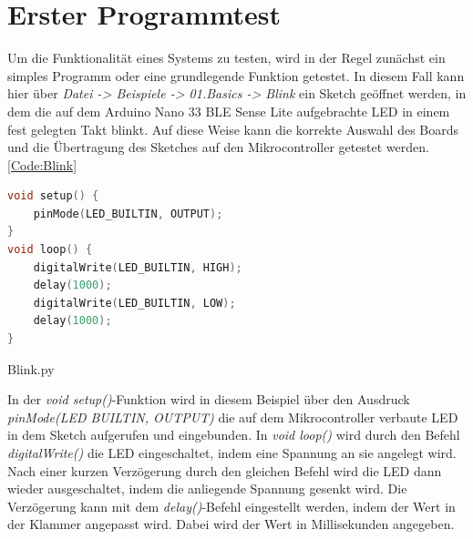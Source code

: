 \section{Erster Programmtest}
Um die Funktionalität eines Systems zu testen, wird in der Regel zunächst ein simples Programm oder eine grundlegende Funktion getestet.
In diesem Fall kann hier über \textit{Datei -> Beispiele -> 01.Basics -> Blink} ein Sketch geöffnet werden, in dem die auf dem Arduino Nano 33 BLE Sense Lite aufgebrachte LED in einem fest gelegten Takt blinkt. Auf diese Weise kann die korrekte Auswahl des Boards und die Übertragung des Sketches auf den Mikrocontroller getestet werden.
\ref{Code:Blink}

\begin{code}
	\begin{lstlisting}[language=c++]
void setup() {
	pinMode(LED_BUILTIN, OUTPUT);
}
void loop() {
	digitalWrite(LED_BUILTIN, HIGH);
	delay(1000);                     
	digitalWrite(LED_BUILTIN, LOW);  
	delay(1000);                     
}
\end{lstlisting}      

\caption[Blink.py]{Blink.py}\label{Code:Blink}    
\end{code} 

In der \textit{void setup()}-Funktion wird in diesem Beispiel über den Ausdruck \textit{pinMode(LED BUILTIN, OUTPUT)} die auf dem Mikrocontroller verbaute LED in dem Sketch aufgerufen und eingebunden.
In \textit{void loop()} wird durch den Befehl\textit{ digitalWrite()} die LED eingeschaltet, indem eine Spannung an sie angelegt wird. Nach einer kurzen Verzögerung durch den gleichen Befehl wird die LED dann wieder ausgeschaltet, indem die anliegende Spannung gesenkt wird. Die Verzögerung kann mit dem \textit{delay()}-Befehl eingestellt werden, indem der Wert in der Klammer angepasst wird. Dabei wird der Wert in Millisekunden angegeben.\cite{Arduino.2014}
